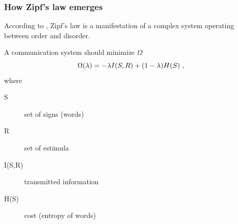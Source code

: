 \documentclass[notes]{beamer}
\begin{document}
\frame
{
  \frametitle{How Zipf's law emerges}
  According to \cite{ramon2003,ferrer05}, Zipf's law is a manifestation
  of a complex system operating between order and disorder.

  \vspace{0.5cm}
  A communication system should minimize $\Omega$ 
  \begin{equation}
  \Omega(\lambda) = - \lambda I(S,R) + (1-\lambda) H(S) \textmd{ ,}
  \end{equation}
  where
  \begin{description}
  \item[S] set of signs (words)
  \item[R] set of estimula 
  \item[I(S,R)] transmitted information 
  \item[H(S)] cost (entropy of words) 
  \end{description}
}
\end{document}
